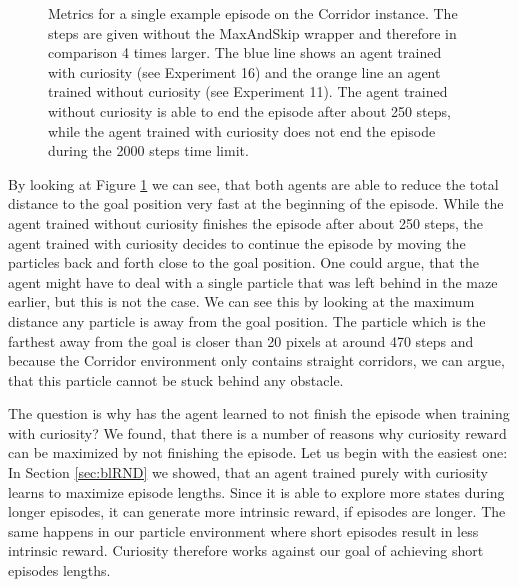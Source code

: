 \begin{figure}[htp]
\begin{center}
\begin{tabular}{c}
        \end{tabular}
    \end{center}
    \caption[Episode metrics on the Corridor Environment]{Metrics for a single example episode on the Corridor instance. The steps are given without the MaxAndSkip wrapper and therefore in comparison 4 times larger. The blue line shows an agent trained with curiosity (see Experiment 16) and the orange line an agent trained without curiosity (see Experiment 11). The agent trained without curiosity is able to end the episode after about 250 steps, while the agent trained with curiosity does not end the episode during the 2000 steps time limit.} \label{fig:curiosity_ep_analysis}
\end{figure}


By looking at Figure \ref{fig:curiosity_ep_analysis} we can see, that both agents are able to reduce the total distance to the goal position very fast at the beginning of the episode. While the agent trained without curiosity finishes the episode after about 250 steps, the agent trained with curiosity decides to continue the episode by moving the particles back and forth close to the goal position. One could argue, that the agent might have to deal with a single particle that was left behind in the maze earlier, but this is not the case. We can see this by looking at the maximum distance any particle is away from the goal position. The particle which is the farthest away from the goal is closer than 20 pixels at around 470 steps and because the Corridor environment only contains straight corridors, we can argue, that this particle cannot be stuck behind any obstacle. 

The question is why has the agent learned to not finish the episode when training with curiosity? We found, that there is a number of reasons why curiosity reward can be maximized by not finishing the episode. Let us begin with the easiest one: In Section \ref{sec:blRND} we showed, that an agent trained purely with curiosity learns to maximize episode lengths. Since it is able to explore more states during longer episodes, it can generate more intrinsic reward, if episodes are longer. The same happens in our particle environment where short episodes result in less intrinsic reward. Curiosity therefore works against our goal of achieving short episodes lengths. 


